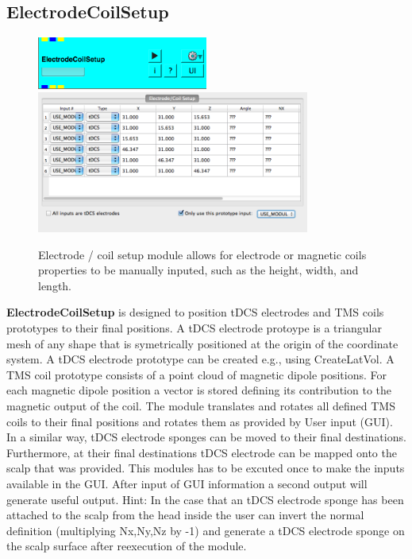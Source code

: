 \documentclass[fleqn,11pt,openany]{book}
\newcommand{\imgSm}{0.5}
\begin{document}
\subsection{ElectrodeCoilSetup}
\begin{figure}[H]
	\centering
	\includegraphics[width=\imgSm\textwidth]{BrainStimulation_figures/ElectrodeCoilSetup.png}
	\includegraphics[width=0.8\textwidth]{BrainStimulation_figures/ElectrodeCoilSetup_GUI.png}
	\caption{Electrode / coil setup module allows for electrode or magnetic coils properties to be manually inputed, such as the height, width, and length.}
	\label{fig:elec_coil_setup}
\end{figure}

\textbf{ElectrodeCoilSetup} is designed to position tDCS electrodes and TMS coils prototypes to their final positions. A tDCS electrode protoype is a triangular mesh
of any shape that is symetrically positioned at the origin of the coordinate system. A tDCS electrode prototype can be created e.g., using CreateLatVol.
A TMS coil prototype consists of a point cloud of magnetic dipole positions. For each magnetic dipole position a vector is stored defining
its contribution to the magnetic output of the coil. The module translates and rotates all defined TMS coils to their final positions and rotates them
as provided by User input (GUI). In a similar way, tDCS electrode sponges can be moved to their final destinations. Furthermore, at their final destinations
tDCS electrode can be mapped onto the scalp that was provided. This modules has to be excuted once to make the inputs available in the GUI.
After input of GUI information a second output will generate useful output. 
Hint: In the case that an tDCS electrode sponge has been attached to the scalp from the head inside the user can invert the normal definition (multiplying Nx,Ny,Nz
by -1) and generate a tDCS electrode sponge on the scalp surface after reexecution of the module. 
\end{document}
